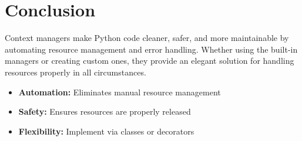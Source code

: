 \documentclass[12pt,letterpaper]{article}
\begin{document}
\section{Conclusion}

Context managers make Python code cleaner, safer, and more maintainable by automating resource management and error handling. Whether using the built-in managers or creating custom ones, they provide an elegant solution for handling resources properly in all circumstances.

\begin{itemize}
    \item \textbf{\textcolor{pythonBlue}{Automation:}} Eliminates manual resource management
    \item \textbf{\textcolor{pythonBlue}{Safety:}} Ensures resources are properly released
    \item \textbf{\textcolor{pythonBlue}{Flexibility:}} Implement via classes or decorators
\end{itemize}
\end{document}
